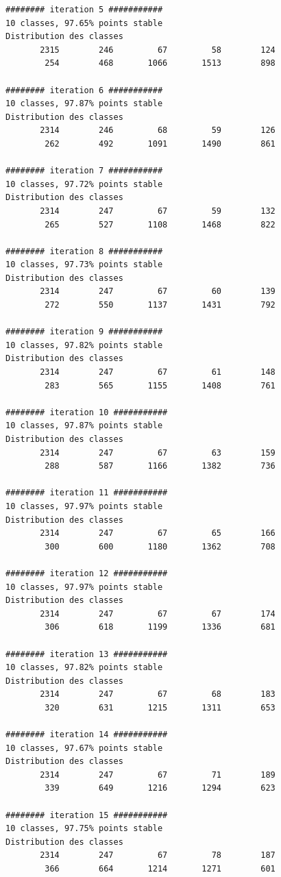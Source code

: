 \documentclass[land,article,submit,pdftex,moreauthors]{Definitions/mdpi}
\begin{document}
\begin{scriptsize}
\begin{verbatim}
######## iteration 5 ###########
10 classes, 97.65% points stable
Distribution des classes
       2315        246         67         58        124
        254        468       1066       1513        898

######## iteration 6 ###########
10 classes, 97.87% points stable
Distribution des classes
       2314        246         68         59        126
        262        492       1091       1490        861

######## iteration 7 ###########
10 classes, 97.72% points stable
Distribution des classes
       2314        247         67         59        132
        265        527       1108       1468        822

######## iteration 8 ###########
10 classes, 97.73% points stable
Distribution des classes
       2314        247         67         60        139
        272        550       1137       1431        792

######## iteration 9 ###########
10 classes, 97.82% points stable
Distribution des classes
       2314        247         67         61        148
        283        565       1155       1408        761

######## iteration 10 ###########
10 classes, 97.87% points stable
Distribution des classes
       2314        247         67         63        159
        288        587       1166       1382        736

######## iteration 11 ###########
10 classes, 97.97% points stable
Distribution des classes
       2314        247         67         65        166
        300        600       1180       1362        708

######## iteration 12 ###########
10 classes, 97.97% points stable
Distribution des classes
       2314        247         67         67        174
        306        618       1199       1336        681

######## iteration 13 ###########
10 classes, 97.82% points stable
Distribution des classes
       2314        247         67         68        183
        320        631       1215       1311        653

######## iteration 14 ###########
10 classes, 97.67% points stable
Distribution des classes
       2314        247         67         71        189
        339        649       1216       1294        623

######## iteration 15 ###########
10 classes, 97.75% points stable
Distribution des classes
       2314        247         67         78        187
        366        664       1214       1271        601


\end{verbatim}
\end{scriptsize}
\end{document}
